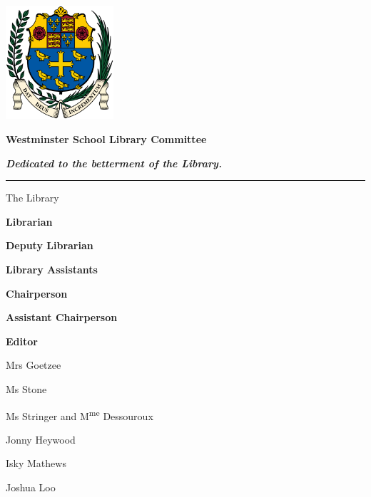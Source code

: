 \pagestyle{empty}
\setlength{\parskip}{0em}
\centering

\includegraphics[width=0.3\textwidth]{logo.png}

\vspace{3em}

\Huge

\textbf{Westminster School Library Committee}

\Large

\vspace{1em}

\textbf{\textit{Dedicated to the betterment of the Library.}}

\vspace{1.5em}

\hrule

\vspace{1.5em}

\huge

The Library

\Large

\begin{paracol}{2}

\begin{flushright}

\textbf{Librarian}

\textbf{Deputy Librarian}

\textbf{Library Assistants}

\textbf{Chairperson}

\textbf{Assistant Chairperson}

\textbf{Editor}

\end{flushright}

\switchcolumn

\begin{flushleft}

\vspace{0.05em}

Mrs Goetzee

Ms Stone

Ms Stringer and M\textsuperscript{me} Dessouroux

Jonny Heywood

Isky Mathews

Joshua Loo

\end{flushleft}

\end{paracol}

